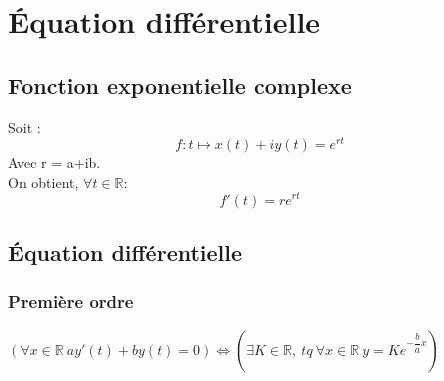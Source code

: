 
\chapter{Équation différentielle}
\section{Fonction exponentielle complexe}
Soit :
$$f : t \mapsto x(t) + iy(t)= e^{rt}$$
Avec r = a+ib. \\On obtient, $\forall t \in \mathbb{R}$:
$$f'(t) = re^{rt}$$
\section{Équation différentielle}
\subsection{Première ordre}
$(\forall x \in \mathbb{R}~ ay'(t) + by(t) = 0) \Leftrightarrow (\exists K \in \mathbb{R},~ tq~ \forall x \in \mathbb{R}~ y=Ke^{-\dfrac{b}{a}x})$
